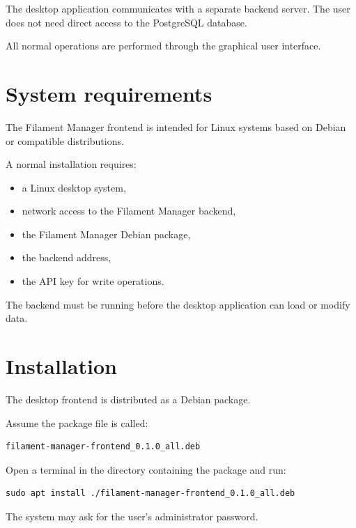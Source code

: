 \documentclass[a4paper,11pt]{article}
\begin{document}
The desktop application communicates with a separate backend server. The user
does not need direct access to the PostgreSQL database.

All normal operations are performed through the graphical user interface.

\section{System requirements}

The Filament Manager frontend is intended for Linux systems based on Debian
or compatible distributions.

A normal installation requires:

\begin{itemize}
  \item a Linux desktop system,
  \item network access to the Filament Manager backend,
  \item the Filament Manager Debian package,
  \item the backend address,
  \item the API key for write operations.
\end{itemize}

The backend must be running before the desktop application can load or modify
data.

\section{Installation}

The desktop frontend is distributed as a Debian package.

Assume the package file is called:

\begin{lstlisting}
filament-manager-frontend_0.1.0_all.deb
\end{lstlisting}

Open a terminal in the directory containing the package and run:

\begin{lstlisting}
sudo apt install ./filament-manager-frontend_0.1.0_all.deb
\end{lstlisting}

The system may ask for the user's administrator password.
\end{document}
